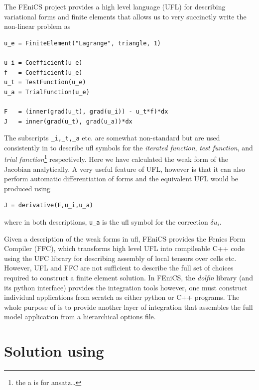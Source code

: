 The FEniCS project provides a  high level language (UFL) for describing
variational forms and finite elements that allows us to very succinctly write the
non-linear problem  as 
\begin{lstlisting}[style=UFL]
u_e = FiniteElement("Lagrange", triangle, 1)

u_i = Coefficient(u_e)
f   = Coefficient(u_e)
u_t = TestFunction(u_e)
u_a = TrialFunction(u_e)

F   = (inner(grad(u_t), grad(u_i)) - u_t*f)*dx
J   = inner(grad(u_t), grad(u_a))*dx
\end{lstlisting}
The subscripts \texttt{\_i,\_t,\_a} etc. are somewhat non-standard but
are used consistently in \TF{} to describe ufl symbols for the
\emph{iterated function}, \emph{test function}, and \emph{trial
  function}\footnote{the a is for ansatz\ldots{}} respectively.  Here we have
calculated the weak form of the Jacobian analytically. A very useful
feature of UFL, however is that it can also perform automatic
differentiation of forms and the equivalent UFL would be produced
using
\begin{lstlisting}[style=UFL]
J = derivative(F,u_i,u_a)
\end{lstlisting}
where in both descriptions, \texttt{u\_a} is the ufl symbol for the
correction $\delta u_{i}$.  

Given a description of the weak forms in ufl,  FEniCS provides the
Fenics Form Compiler (FFC), which transforms high level UFL into
compileable C++ code using the UFC library for describing assembly of
local tensors over cells etc.  However, UFL and FFC are not sufficient
to describe the full set of choices required to construct a finite
element solution.  In FEniCS,  the \emph{dolfin} library (and its
python interface) provides the integration tools however, one must
construct individual applications from scratch as either python or C++
programs.  The whole purpose of \TF{} is to provide another layer of
integration that assembles the full model application from a
hierarchical options file. 

\section{Solution using \TF}
\label{sec:ch2-solution-using-tf}

